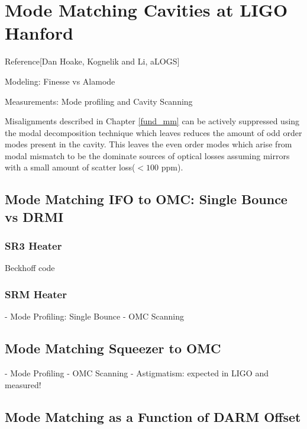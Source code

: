 \chapter{Mode Matching Cavities at LIGO Hanford}
	Reference[Dan Hoake, Kognelik and Li, aLOGS]
	
	Modeling: Finesse vs Alamode
	
	Measurements: Mode profiling and Cavity Scanning
	
	Misalignments described in Chapter \ref{fund_mm} can be actively suppressed using the modal decomposition technique which leaves reduces the amount of odd order modes present in the cavity.  This leaves the even order modes which arise from modal mismatch to be the dominate sources of optical losses assuming mirrors with a small amount of scatter loss($<100$ ppm).
	
	\section{Mode Matching IFO to OMC: Single Bounce vs DRMI}
	\subsection{SR3 Heater}
	Beckhoff code
	
	
	\subsection{SRM Heater}
	- Mode Profiling: Single Bounce
	- OMC Scanning
	
	\section{Mode Matching Squeezer to OMC}
	- Mode Profiling
	- OMC Scanning
	- Astigmatism: expected in LIGO and measured!
	
	\section{Mode Matching as a Function of DARM Offset}

